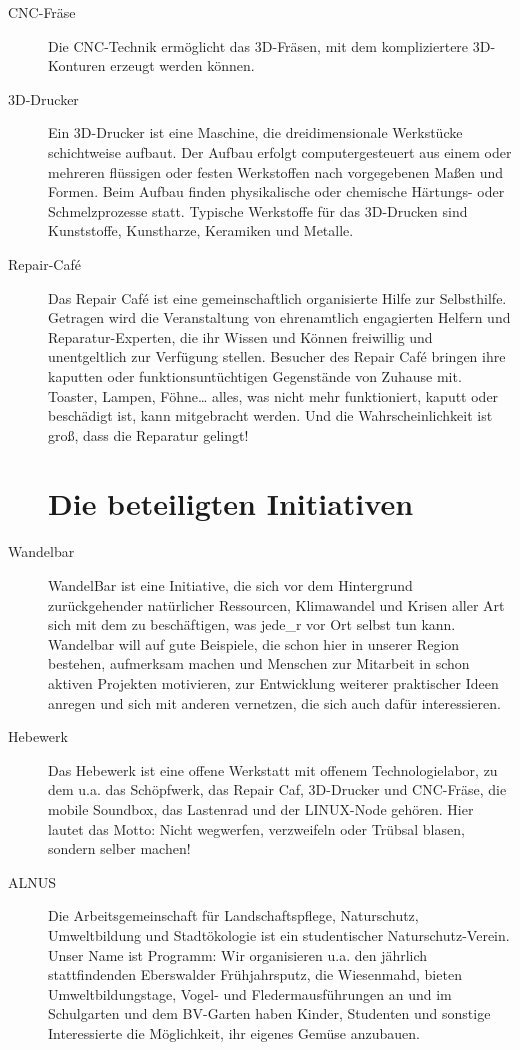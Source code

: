 \documentclass{leaflet}
\begin{document}
\begin{description}
\item[CNC-Fräse] Die CNC-Technik ermöglicht das 3D-Fräsen, mit dem kompliziertere 3D-Konturen erzeugt werden können. 

\item[3D-Drucker] Ein 3D-Drucker ist eine Maschine, die dreidimensionale Werkstücke schichtweise aufbaut. Der Aufbau erfolgt computergesteuert aus einem oder mehreren flüssigen oder festen Werkstoffen nach vorgegebenen Maßen und Formen. Beim Aufbau finden physikalische oder chemische Härtungs- oder Schmelzprozesse statt. Typische Werkstoffe für das 3D-Drucken sind Kunststoffe, Kunstharze, Keramiken und Metalle.

\item[Repair-Caf\'{e}] Das Repair Caf\'{e} ist eine gemeinschaftlich organisierte Hilfe zur Selbsthilfe. Getragen wird die Veranstaltung von ehrenamtlich engagierten Helfern und Reparatur-Experten, die ihr Wissen und Können freiwillig und unentgeltlich zur Verfügung stellen. Besucher des Repair Caf\'{e} bringen ihre kaputten oder funktionsuntüchtigen Gegenstände von Zuhause mit. Toaster, Lampen, Föhne… alles, was nicht mehr funktioniert, kaputt oder beschädigt ist, kann mitgebracht werden. Und die Wahrscheinlichkeit ist groß, dass die Reparatur gelingt!


\newpage	

\section{Die beteiligten Initiativen}

\item[Wandelbar] WandelBar ist eine Initiative, die sich vor dem Hintergrund zurückgehender natürlicher Ressourcen, Klimawandel und Krisen aller Art sich mit dem zu beschäftigen, was jede\_r vor Ort selbst tun kann. Wandelbar will auf gute Beispiele, die schon hier in unserer Region bestehen, aufmerksam machen und Menschen zur Mitarbeit in schon aktiven Projekten motivieren, zur Entwicklung weiterer praktischer Ideen anregen und sich mit anderen vernetzen, die sich auch dafür interessieren.


\item[Hebewerk] Das Hebewerk ist eine offene Werkstatt mit offenem Technologielabor, zu dem u.a. das Schöpfwerk, das Repair Caf, 3D-Drucker und CNC-Fräse, die mobile Soundbox, das Lastenrad  und der LINUX-Node gehören. Hier lautet das Motto: Nicht wegwerfen, verzweifeln oder Trübsal blasen, sondern selber machen!


\item[ALNUS] Die Arbeitsgemeinschaft für Landschaftspflege, Naturschutz, Umweltbildung und Stadtökologie ist ein studentischer Naturschutz-Verein. Unser Name ist Programm: Wir organisieren u.a. den jährlich stattfindenden Eberswalder Frühjahrsputz, die Wiesenmahd, bieten Umweltbildungstage, Vogel- und Fledermausführungen an und im Schulgarten und dem BV-Garten haben Kinder, Studenten und sonstige Interessierte die Möglichkeit, ihr eigenes Gemüse anzubauen.

\end{description}
\end{document}
